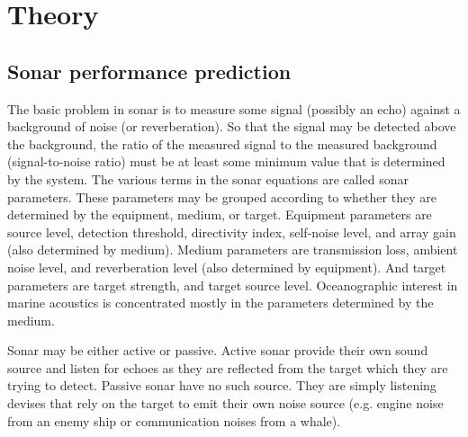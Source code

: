\chapter*{Theory} 
\section{ Sonar performance prediction } \label{ Sonar performance prediction }

\noindent The basic problem in sonar is to measure some signal (possibly an echo) against a background of noise (or reverberation). So that the signal may be detected above the background, the ratio of the measured signal to the measured background (signal-to-noise ratio) must be at least some minimum value that is determined by the system. The various terms in the sonar equations are called sonar parameters. These parameters may be grouped according to whether they are determined by the equipment, medium, or target. Equipment parameters are source level, detection threshold, directivity index, self-noise level, and array gain (also determined by medium). Medium parameters are transmission loss, ambient noise level, and reverberation level (also determined by equipment). And target parameters are target strength, and target source level. Oceanographic interest in marine acoustics is concentrated mostly in the parameters determined by the medium.

\noindent Sonar may be either active or passive. Active sonar provide their own sound source and listen for echoes as they are reflected from the target which they are trying to detect. Passive sonar have no such source. They are simply listening devises that rely on the target to emit their own noise source (e.g. engine noise from an enemy ship or communication noises from a whale).

